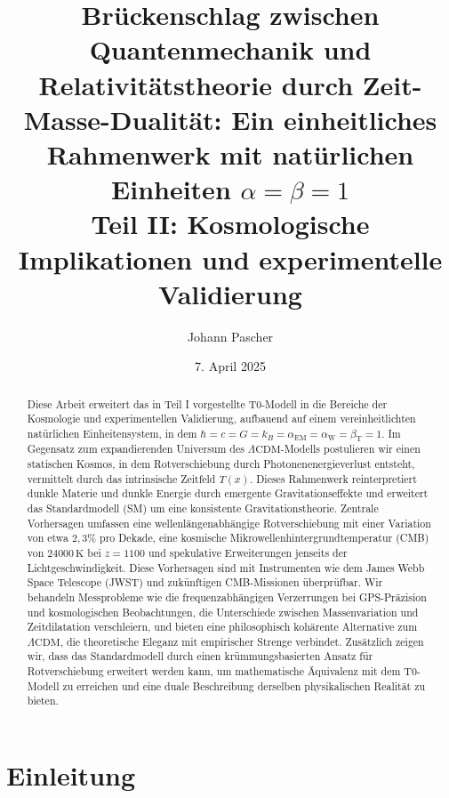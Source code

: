 \documentclass[twocolumn,aps,prl]{revtex4-2}
\newcommand{\Tfield}{T(x)}
\newcommand{\alphaEM}{\alpha_{\text{EM}}}
\newcommand{\alphaW}{\alpha_{\text{W}}}
\newcommand{\betaT}{\beta_{\text{T}}}
\newcommand{\LCDM}{\Lambda\text{CDM}}
\begin{document}
	
	\title{Brückenschlag zwischen Quantenmechanik und Relativitätstheorie durch Zeit-Masse-Dualität: Ein einheitliches Rahmenwerk mit natürlichen Einheiten \(\alpha = \beta = 1\) \\ Teil II: Kosmologische Implikationen und experimentelle Validierung}
	\author{Johann Pascher}
	\date{7. April 2025}
	
	\begin{abstract}
		Diese Arbeit erweitert das in Teil I vorgestellte T0-Modell in die Bereiche der Kosmologie und experimentellen Validierung, aufbauend auf einem vereinheitlichten natürlichen Einheitensystem, in dem \(\hbar = c = G = k_B = \alphaEM = \alphaW = \betaT = 1\). Im Gegensatz zum expandierenden Universum des \(\LCDM\)-Modells postulieren wir einen statischen Kosmos, in dem Rotverschiebung durch Photonenenergieverlust entsteht, vermittelt durch das intrinsische Zeitfeld \(\Tfield\). Dieses Rahmenwerk reinterpretiert dunkle Materie und dunkle Energie durch emergente Gravitationseffekte und erweitert das Standardmodell (SM) um eine konsistente Gravitationstheorie. Zentrale Vorhersagen umfassen eine wellenlängenabhängige Rotverschiebung mit einer Variation von etwa \(2,3\%\) pro Dekade, eine kosmische Mikrowellenhintergrundtemperatur (CMB) von \(24000 \, \text{K}\) bei \(z = 1100\) und spekulative Erweiterungen jenseits der Lichtgeschwindigkeit. Diese Vorhersagen sind mit Instrumenten wie dem James Webb Space Telescope (JWST) und zukünftigen CMB-Missionen überprüfbar. Wir behandeln Messprobleme wie die frequenzabhängigen Verzerrungen bei GPS-Präzision und kosmologischen Beobachtungen, die Unterschiede zwischen Massenvariation und Zeitdilatation verschleiern, und bieten eine philosophisch kohärente Alternative zum \(\LCDM\), die theoretische Eleganz mit empirischer Strenge verbindet. Zusätzlich zeigen wir, dass das Standardmodell durch einen krümmungsbasierten Ansatz für Rotverschiebung erweitert werden kann, um mathematische Äquivalenz mit dem T0-Modell zu erreichen und eine duale Beschreibung derselben physikalischen Realität zu bieten.
	\end{abstract}
	
	\maketitle
	
	\section{Einleitung}
	\label{sec:introduction}
	
\end{document}
